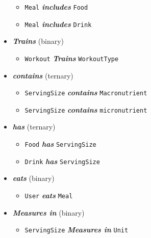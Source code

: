 \documentclass{report}
\begin{document}
\begin{itemize}
            \begin{itemize}[label=$\circ$]
                \item \texttt{Meal} \textit{\textbf{includes}} \texttt{Food}
                \item \texttt{Meal} \textit{\textbf{includes}} \texttt{Drink}
            \end{itemize}
        \item \textit{\textbf{Trains}} (binary)
            \begin{itemize}[label=$\circ$] 
                \item \texttt{Workout}  \textit{\textbf{Trains}} \texttt{WorkoutType}
            \end{itemize}
        \item \textit{\textbf{contains}} (ternary)
            \begin{itemize}[label=$\circ$]
                \item        \texttt{ServingSize} \textit{\textbf{contains}} \texttt{Macronutrient}
                \item            \texttt{ServingSize} \textit{\textbf{contains}} \texttt{micronutrient}
            \end{itemize}
        \item \textit{\textbf{has}} (ternary)
            \begin{itemize}[label=$\circ$]
                \item \texttt{Food} \textit{\textbf{has}} \texttt{ServingSize}
                \item \texttt{Drink} \textit{\textbf{has}} \texttt{ServingSize}
            \end{itemize}
        \item \textit{\textbf{eats}} (binary)
            \begin{itemize}[label=$\circ$]
                \item \texttt{User} \textit{\textbf{eats}} \texttt{Meal}
            \end{itemize}
        \item \textit{\textbf{Measures in}} (binary)
            \begin{itemize}[label=$\circ$]
                \item \texttt{ServingSize} \textit{\textbf{Measures in}} \texttt{Unit}
            \end{itemize}
        \end{itemize}
\end{document}
